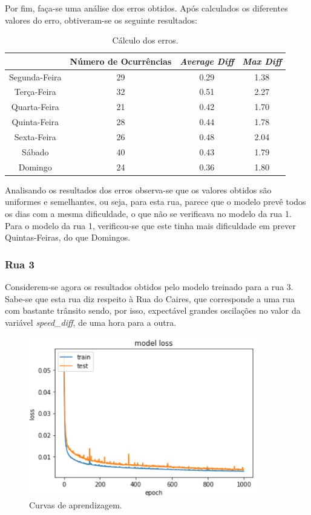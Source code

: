\documentclass[a4paper, 12pt]{article}
\begin{document}
Por fim, faça-se uma análise dos erros obtidos. Após calculados os diferentes valores do erro, obtiveram-se os seguinte resultados:

\begin{table}[H]
	\centering
	\begin{tabular}{||c||c|c|c||}
		\hline\hline
		& Número de Ocurrências & \textit{Average Diff} & \textit{Max Diff} \\
		\hline\hline
		 Segunda-Feira &29& 0.29& 1.38 \\
		\hline
		 Terça-Feira  &32&0.51 & 2.27\\
		\hline
		 Quarta-Feira&21 & 0.42& 1.70	\\
		\hline
		 Quinta-Feira&28  & 0.44& 1.78	\\
		\hline
		 Sexta-Feira &26& 0.48& 2.04  \\
		\hline
		 Sábado &40 & 0.43
 & 1.79\\
		\hline
		 Domingo & 24&
0.36 & 
1.80
\\
		\hline\hline
	\end{tabular}
	\label{table:rua2}
	\caption{Cálculo dos erros.}
\end{table}

Analisando os resultados dos erros observa-se que os valores obtidos são uniformes e semelhantes, ou seja, para esta rua, parece que o modelo prevê todos os dias com a mesma dificuldade, o que não se verificava no modelo da rua 1. Para o modelo da rua 1, verificou-se que este tinha mais dificuldade em prever Quintas-Feiras, do que Domingos.

\subsubsection{Rua 3}

Considerem-se agora os resultados obtidos pelo modelo treinado para a rua 3. Sabe-se que esta rua diz respeito à Rua do Caires, que corresponde a uma rua com bastante trânsito sendo, por isso, expectável grandes oscilações no valor da variável \textit{speed\_diff}, de uma hora para a outra.

\begin{figure}[H]
	\centering
	\includegraphics[width=10cm]{resultados/curvas_aprend_3.png}
	\caption{Curvas de aprendizagem.}
\end{figure}
\end{document}
